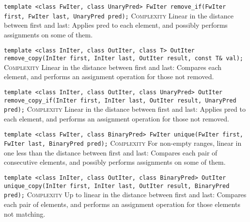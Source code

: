 \noindent{}\hspace*{0.25em}\lstinline[basicstyle=\ttfamily\color{corange}]{template <class FwIter, class UnaryPred> FwIter remove_if(FwIter first, FwIter last, UnaryPred pred);} \textsc{Complexity} Linear in the distance between first and last: Applies pred to each element, and possibly performs assignments on some of them.\\\vspace{-0.6em}

\noindent{}\hspace*{0.25em}\lstinline[basicstyle=\ttfamily\color{corange}]{template <class InIter, class OutIter, class T> OutIter remove_copy(InIter first, InIter last, OutIter result, const T& val);} \textsc{Complexity} Linear in the distance between first and last: Compares each element, and performs an assignment operation for those not removed.\\\vspace{-0.6em}

\noindent{}\hspace*{0.25em}\lstinline[basicstyle=\ttfamily\color{corange}]{template <class InIter, class OutIter, class UnaryPred> OutIter remove_copy_if(InIter first, InIter last, OutIter result, UnaryPred pred);} \textsc{Complexity} Linear in the distance between first and last: Applies pred to each element, and performs an assignment operation for those not removed.\\\vspace{-0.6em}

\noindent{}\hspace*{0.25em}\lstinline[basicstyle=\ttfamily\color{corange}]{template <class FwIter, class BinaryPred> FwIter unique(FwIter first, FwIter last, BinaryPred pred);} \textsc{Complexity} For non-empty ranges, linear in one less than the distance between first and last: Compares each pair of consecutive elements, and possibly performs assignments on some of them.\\\vspace{-0.6em}

\noindent{}\hspace*{0.25em}\lstinline[basicstyle=\ttfamily\color{corange}]{template <class InIter, class OutIter, class BinaryPred> OutIter unique_copy(InIter first, InIter last, OutIter result, BinaryPred pred);} \textsc{Complexity} Up to linear in the distance between first and last: Compares each pair of elements, and performs an assignment operation for those elements not matching.\\\vspace{-0.6em}

